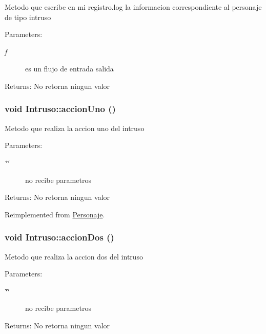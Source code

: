 Metodo que escribe en mi registro.log la informacion correspondiente al personaje de tipo intruso \begin{Desc}
\item[Parameters:]
\begin{description}
\item[{\em f}]es un flujo de entrada salida \end{description}
\end{Desc}
\begin{Desc}
\item[Returns:]No retorna ningun valor \end{Desc}
\hypertarget{classIntruso_dee71b00225e294086d8980625a32ab3}{
\subsubsection[accionUno]{\setlength{\rightskip}{0pt plus 5cm}void Intruso::accionUno ()}}
\label{classIntruso_dee71b00225e294086d8980625a32ab3}


Metodo que realiza la accion uno del intruso \begin{Desc}
\item[Parameters:]
\begin{description}
\item[{\em \char`\"{}\char`\"{}}]no recibe parametros \end{description}
\end{Desc}
\begin{Desc}
\item[Returns:]No retorna ningun valor \end{Desc}


Reimplemented from \hyperlink{classPersonaje_0454b75ccc8f7e33f03e2cfb2c59e725}{Personaje}.\hypertarget{classIntruso_6fef0ae823fdabc05796413f53d073e5}{
\subsubsection[accionDos]{\setlength{\rightskip}{0pt plus 5cm}void Intruso::accionDos ()}}
\label{classIntruso_6fef0ae823fdabc05796413f53d073e5}


Metodo que realiza la accion dos del intruso \begin{Desc}
\item[Parameters:]
\begin{description}
\item[{\em \char`\"{}\char`\"{}}]no recibe parametros \end{description}
\end{Desc}
\begin{Desc}
\item[Returns:]No retorna ningun valor \end{Desc}


